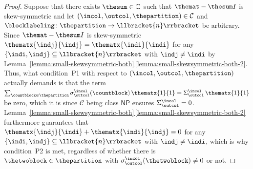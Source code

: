\documentclass[10pt,a4paper]{amsart}
\numberwithin{equation}{section}
\newcommand{\identitymatrix}{I}
\newcommand{\comps}{\mathbb{C}}
\newcommand{\dwi}[1]{\llbracket{#1}\rrbracket}
\newcommand{\xfromto}[3]{#1 \colon  #2 \to #3}
\newcommand{\tcsx}[2]{\Sigma^{#1}_{#2}}
\newcommand{\csx}[3]{\sigma^{#1}_{#2}(#3)}
\newcommand{\thedim}{n}
\newcommand{\thecat}{\mathcal{C}}
\newcommand{\conditionone}{P1}
\newcommand{\conditiontwo}{P2}
\newcommand{\onlyneutralpartitions}{\mathsf{NP}}
\begin{document}
{\begin{proof}
      Suppose that there exists $\thesum\in\comps$ such that $\themat-\thesum\identitymatrix$ is skew-symmetric and let $(\incol,\outcol,\thepartition)\in\thecat$  and $\xfromto{\blocklabeling}{\thepartition}{\dwi{\thedim}}$ be arbitrary.
      Since $\themat-\thesum\identitymatrix$ is skew-symmetric $\thematx{\indj}{\indj}=\thematx{\indi}{\indi}$ for any $\{\indi,\indj\}\subseteq \dwi{\thedim}$ with $\indj\neq \indi$ by Lem\-ma~\hyperref[lemma:small-skewsymmetric-both-2]{\ref*{lemma:small-skewsymmetric-both}\,\ref*{lemma:small-skewsymmetric-both-2}}. Thus, what con\-di\-tion~\conditionone{} with respect to $(\incol,\outcol,\thepartition)$ actually demands is that the term $\sum_{\countblock\in\thepartition}\csx{\incol}{\outcol}{\countblock}\,\thematx{1}{1}=\tcsx{\incol}{\outcol}\,\thematx{1}{1}$ be zero, which it is since $\thecat$ being class $\onlyneutralpartitions$ ensures $\tcsx{\incol}{\outcol}=0$. Lem\-ma~\hyperref[lemma:small-skewsymmetric-both-2]{\ref*{lemma:small-skewsymmetric-both}\,\ref*{lemma:small-skewsymmetric-both-2}} furthermore guarantees that $\thematx{\indj}{\indi}+\thematx{\indi}{\indj}=0$ for any $\{\indi,\indj\}\subseteq \dwi{\thedim}$ with $\indj\neq \indi$, which is why con\-di\-tion~\conditiontwo{} is met, regardless of whether there is $\thetwoblock\in \thepartition$ with $\csx{\incol}{\outcol}{\thetwoblock}\neq 0$ or not.


\end{proof}}
\end{document}
